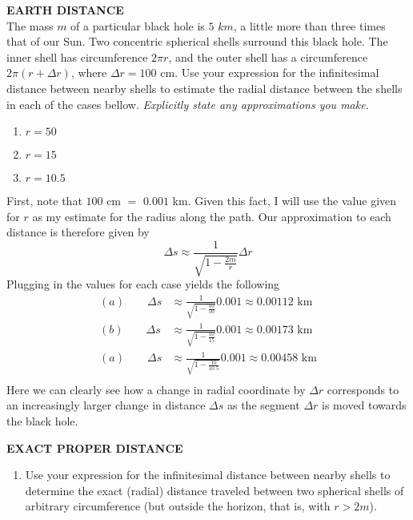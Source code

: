 \documentclass[a4paper, 11pt]{article}
\newenvironment{solution}{%
	\begin{list}{}{%
			\setlength{\topsep}{0pt}%
			\setlength{\leftmargin}{0.5cm}%
			\setlength{\rightmargin}{0.5cm}%
			\setlength{\listparindent}{\parindent}%
			\setlength{\itemindent}{\parindent}%
			\setlength{\parsep}{\parskip}%
		}%
		\item[]}{\end{list}}
\begin{document}
\begin{enumerate}[leftmargin=0em, label=\textbf{\arabic*}.]
  \item \textbf{EARTH DISTANCE}\\
    The mass $m$ of a particular black hole is $5$ $km$, a little more than
    three times that of our Sun. Two concentric spherical shells surround this
    black hole. The inner shell has circumference $2\pi r$, and the outer shell
    has a circumference $2\pi(r+\Delta r)$, where $\Delta r = 100$ cm. Use your
    expression for the infinitesimal distance between nearby shells to estimate
    the radial distance between the shells in each of the cases bellow.
    \textit{Explicitly state any approximations you make.}
    \begin{enumerate}[leftmargin=2em, label=(\textbf{\alph*})]
      \item $r = 50$
      \item $r = 15$
      \item $r = 10.5$
    \end{enumerate}
    \begin{solution}
      First, note that $100$ cm $=$ $0.001$ km. Given this fact, I will use the
      value given for $r$ as my estimate for the radius along the path. Our
      approximation to each distance is therefore given by
      \begin{equation}
        \Delta s \approx \frac{1}{\sqrt{1-\frac{2m}{r}}}\Delta r
      \end{equation}
      Plugging in the values for each case yields the following
      \begin{align}
        (a)\qquad \Delta s&\approx \frac{1}{\sqrt{1-\frac{10}{50}}}0.001 \approx 0.00112 \text{ km} \\ 
        (b)\qquad \Delta s&\approx \frac{1}{\sqrt{1-\frac{10}{15}}}0.001 \approx 0.00173 \text{ km} \\ 
        (a)\qquad \Delta s&\approx \frac{1}{\sqrt{1-\frac{10}{10.5}}}0.001 \approx 0.00458 \text{ km} \\ 
      \end{align}
      Here we can clearly see how a change in radial coordinate by $\Delta r$
      corresponds to an increasingly larger change in distance $\Delta s$ as the
      segment $\Delta r$ is moved towards the black hole.
    \end{solution}

  \item \textbf{EXACT PROPER DISTANCE}
    \begin{enumerate}[leftmargin=2em, label=(\textbf{\alph*})]
      \item Use your expression for the infinitesimal distance between nearby
        shells to determine the exact (radial) distance traveled between two
        spherical shells of arbitrary circumference (but outside the horizon,
        that is, with $r>2m$).


\end{enumerate}
\end{enumerate}
\end{document}
